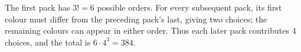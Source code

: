 The first pack has $ 3!=6 $ possible orders. For every subsequent pack, its first colour must differ from the preceding pack's last, giving two choices; the remaining colours can appear in either order. Thus each later pack contributes 4 choices, and the total is $ 6\cdot4^3=\boxed{384}$.
